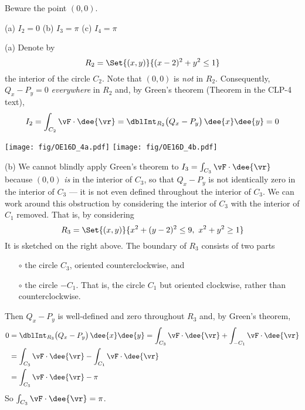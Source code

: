 \begin{hint}
Beware the point $(0,0)$.
\end{hint}

\begin{answer}
(a) $I_2=0$\qquad
(b) $I_3=\pi$\qquad
(c) $I_4=\pi$
\end{answer}

\begin{solution} (a) Denote by
\begin{equation*}
R_2=\Set{(x,y)}{ (x-2)^2+y^2\le 1}
\end{equation*}
the interior of the circle $C_2$. Note that $(0,0)$ is \emph{not}
in $R_2$. Consequently, $Q_x-P_y=0$ \emph{everywhere} in $R_2$ and,
by Green's theorem (Theorem  in the CLP-4 text),
\begin{equation*}
I_2 = \int_{C_2} \vF\cdot\dee{\vr}
    =\dblInt_{R_2} \big(Q_x-P_y\big)\,\dee{x}\dee{y}
    =0
\end{equation*}

\begin{center}
     \texttt{[image: fig/OE16D\_4a.pdf]}\qquad
     \texttt{[image: fig/OE16D\_4b.pdf]}\qquad
\end{center}

(b) We cannot blindly apply Green's theorem to $I_3=\int_{C_3}\vF\cdot\dee{\vr}$
because $(0,0)$ \emph{is} in the interior of $C_3$, so that
$Q_x-P_y$ is not identically zero in the interior of $C_3$ --- it is not
even defined throughout the interior of $C_3$. We can work around this obstruction by considering the interior of $C_3$ with the interior of $C_1$
removed. That is, by considering
\begin{equation*}
R_3 = \Set{(x,y)}{x^2 + (y - 2)^2 \le 9,\ x^2+y^2\ge 1}
\end{equation*}
It is sketched on the right above.
The boundary of $R_3$ consists of two parts
\begin{itemize}\itemsep1pt \parskip0pt  %
\item[$\circ$]
the circle $C_3$, oriented counterclockwise, and
\item[$\circ$]
the circle $-C_1$. That is, the circle $C_1$ but oriented clockwise,
rather than counterclockwise.
\end{itemize}
Then $Q_x-P_y$ is well-defined and zero throughout $R_3$ and,
by Green's theorem,
\begin{align*}
   0 &=\dblInt_{R_3} \big(Q_x-P_y\big)\,\dee{x}\dee{y}
     = \int_{C_3} \vF\cdot\dee{\vr}
             + \int_{-C_1} \vF\cdot\dee{\vr} \\
    &= \int_{C_3} \vF\cdot\dee{\vr}
             - \int_{C_1} \vF\cdot\dee{\vr} \\
    &= \int_{C_3} \vF\cdot\dee{\vr}
             - \pi
\end{align*}
So $\int_{C_3} \vF\cdot\dee{\vr} = \pi$.


\end{solution}
